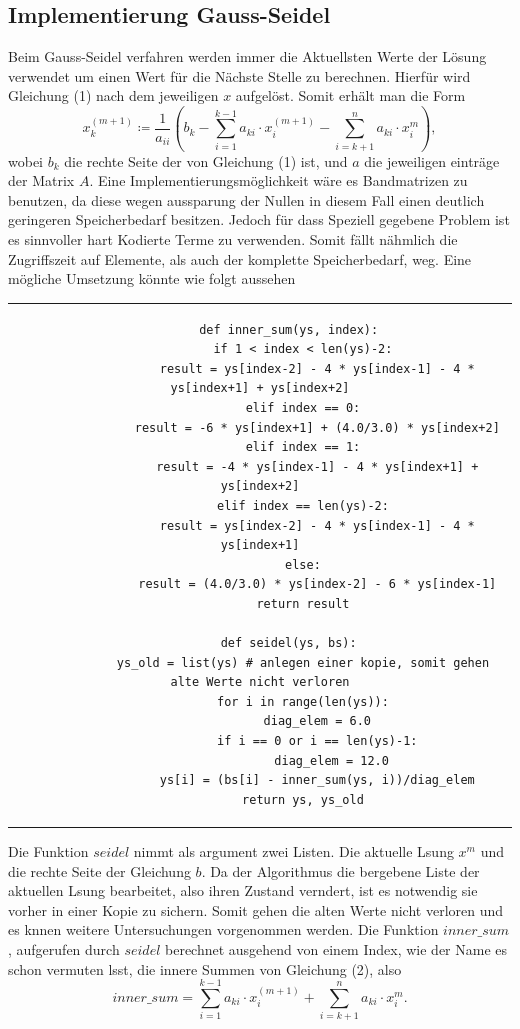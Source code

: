 \documentclass[12pt,titlepage]{article}
\begin{document}
	\subsection{Implementierung Gauss-Seidel}
		
		Beim Gauss-Seidel verfahren werden immer die Aktuellsten Werte der Lösung verwendet um einen Wert für die Nächste Stelle zu berechnen. Hierfür wird Gleichung (1) nach dem jeweiligen $x$ aufgelöst. Somit erhält man die Form
		\begin{equation}
			x_{k}^{(m+1)} \coloneqq \frac{1}{a_{ii}}\left(b_{k} - \sum_{i=1}^{k-1}a_{ki}\cdot x_{i}^{(m+1)} - \sum_{i = k+1}^{n}a_{ki}\cdot x_{i}^m\right),
		\end{equation}
		wobei $b_k$ die rechte Seite der von Gleichung (1) ist, und $a$ die jeweiligen einträge der Matrix $A$.
		Eine Implementierungsmöglichkeit wäre es Bandmatrizen zu benutzen, da diese wegen aussparung der Nullen
		in diesem Fall einen deutlich geringeren Speicherbedarf besitzen. Jedoch für dass Speziell gegebene Problem ist 
		es sinnvoller hart Kodierte Terme zu verwenden. Somit fällt nähmlich die Zugriffszeit auf Elemente, als auch der komplette Speicherbedarf, weg. Eine mögliche Umsetzung könnte wie folgt aussehen \newline
		\newline
		\begin{tabular}{c}
		\begin{lstlisting}
		def inner_sum(ys, index):
		    if 1 < index < len(ys)-2:
		        result = ys[index-2] - 4 * ys[index-1] - 4 * ys[index+1] + ys[index+2]
		    elif index == 0:
		        result = -6 * ys[index+1] + (4.0/3.0) * ys[index+2]
		    elif index == 1:
		        result = -4 * ys[index-1] - 4 * ys[index+1] + ys[index+2]
		    elif index == len(ys)-2:
		        result = ys[index-2] - 4 * ys[index-1] - 4 * ys[index+1]
		    else:
		        result = (4.0/3.0) * ys[index-2] - 6 * ys[index-1]
		    return result
		    
		def seidel(ys, bs):
			ys_old = list(ys) # anlegen einer kopie, somit gehen alte Werte nicht verloren
		    for i in range(len(ys)):
		    	diag_elem = 6.0
		        if i == 0 or i == len(ys)-1:
		        	diag_elem = 12.0
		        ys[i] = (bs[i] - inner_sum(ys, i))/diag_elem
		    return ys, ys_old
	 	\end{lstlisting}
		\end{tabular}
		\newpage
		Die Funktion $seidel$ nimmt als argument zwei Listen. Die aktuelle Lsung  $x^m$ und die rechte Seite der Gleichung $b$. Da der Algorithmus die bergebene Liste der aktuellen Lsung bearbeitet, also ihren Zustand verndert, ist es notwendig sie vorher in einer Kopie zu sichern. Somit gehen die alten Werte nicht verloren
		und es knnen weitere Untersuchungen vorgenommen werden. Die Funktion $inner\_sum$, aufgerufen durch $seidel$ berechnet ausgehend von einem Index, wie der Name es schon vermuten lsst, die innere Summen von Gleichung (2), also
		\begin{equation*}
			inner\_sum = \sum_{i=1}^{k-1}a_{ki}\cdot x_{i}^{(m+1)} + \sum_{i = k+1}^{n}a_{ki}\cdot x_{i}^m.
		\end{equation*}
		
\end{document}
